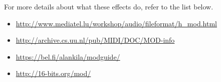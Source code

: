 For more details about what these effects do, refer to the list below.
\begin{itemize}
    \item{\url{http://www.mediatel.lu/workshop/audio/fileformat/h_mod.html}}
    \item{\url{http://archive.cs.uu.nl/pub/MIDI/DOC/MOD-info}}
    \item{\url{https://bel.fi/alankila/modguide/}}
    \item{\url{http://16-bits.org/mod/}}
\end{itemize}